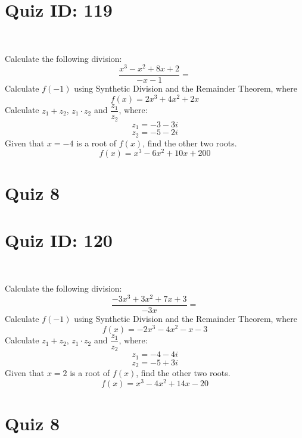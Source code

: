 \documentclass{exam}
\begin{document}
\section*{Quiz ID: 119}
\vspace{0.5cm}\
\vspace{1cm}\
\begin{questions}
\question Calculate the following division:\[\dfrac{
x^3 - x^2 + 8x + 2}{
-x - 1}=\] \makeemptybox{\stretch{2}}
\question Calculate $f(-1)$ using Synthetic Division and the Remainder Theorem, where\[f(x) = 
2x^3 + 4x^2 + 2x\]
\newpage\question Calculate $z_1+z_2$, $z_1\cdot z_2$ and $\dfrac{z_1}{z_2}$, where:\[z_1=-3-3\mathit{i}\]\[z_2=-5-2\mathit{i}\]
\question Given that $x=-4$ is a root of $f(x)$, find the other two roots.\[f(x)=
x^3 - 6x^2 + 10x + 200\]\makeemptybox{\stretch{1}}
\end{questions}\newpage
\newpage
\section*{Quiz 8}
\section*{Quiz ID: 120}
\vspace{0.5cm}\
\vspace{1cm}\
\begin{questions}
\question Calculate the following division:\[\dfrac{
-3x^3 + 3x^2 + 7x + 3}{
-3x}=\] 
\question Calculate $f(-1)$ using Synthetic Division and the Remainder Theorem, where\[f(x) = 
-2x^3 - 4x^2 - x - 3\]
\newpage\question Calculate $z_1+z_2$, $z_1\cdot z_2$ and $\dfrac{z_1}{z_2}$, where:\[z_1=-4-4\mathit{i}\]\[z_2=-5+3\mathit{i}\]\makeemptybox{\stretch{1}}
\question Given that $x=2$ is a root of $f(x)$, find the other two roots.\[f(x)=
x^3 - 4x^2 + 14x - 20\]\makeemptybox{\stretch{1}}
\end{questions}\newpage
\newpage
\section*{Quiz 8}
\end{document}
